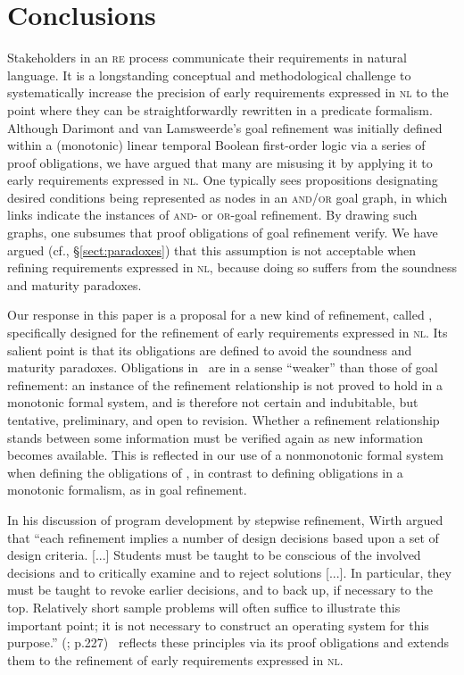 \documentclass[10pt, conference, compsocconf]{IEEEtran}
\begin{document}
\section{Conclusions}\label{sect:conclusions}
Stakeholders in an \textsc{re} process communicate their requirements in natural language.  It is a longstanding conceptual and methodological challenge to systematically increase the precision of early requirements expressed in \textsc{nl} to the point where they can be straightforwardly rewritten in a predicate formalism. Although Darimont and van Lamsweerde's goal refinement \cite{Darimont+:1996:FSE} was initially defined within a (monotonic) linear temporal Boolean first-order logic via a series of proof obligations, we have argued that many are misusing it by applying it to early requirements expressed in \textsc{nl}. One typically sees propositions designating desired conditions being represented as nodes in an \textsc{and}/\textsc{or} goal graph, in which links indicate the instances of \textsc{and}- or \textsc{or}-goal refinement. By drawing such graphs, one subsumes that proof obligations of goal refinement verify. We have argued (cf., \S\ref{sect:paradoxes}) that this assumption is not acceptable when refining requirements expressed in \textsc{nl}, because doing so suffers from the soundness and maturity paradoxes. 

Our response in this paper is a proposal for a new kind of refinement, called \nlref, specifically designed for the refinement of early requirements expressed in \textsc{nl}. Its salient point is that its obligations are defined to avoid the soundness and maturity paradoxes. Obligations in \nlref\ are in a sense ``weaker'' than those of goal refinement: an instance of the refinement relationship is not proved to hold in a monotonic formal system, and is therefore not certain and indubitable, but tentative, preliminary, and open to revision. Whether a refinement relationship stands between some information must be verified again as new information becomes available. This is reflected in our use of a nonmonotonic formal system when defining the obligations of \nlref, in contrast to defining obligations in a monotonic formalism, as in goal refinement. 

In his discussion of program development by stepwise refinement, Wirth argued that ``each refinement implies a number of design decisions based upon a set of design criteria. [...] Students must be taught to be conscious of the involved decisions and to critically examine and to reject solutions [...]. In particular, they must be taught to revoke earlier decisions, and to back up, if necessary to the top. Relatively short sample problems will often suffice to illustrate this important point; it is not necessary to construct an operating system for this purpose.'' (\cite{Wirth:1971:CACM}; p.227) \nlref\ reflects these principles via its proof obligations  and extends them to the refinement of early requirements expressed in \textsc{nl}. 
\end{document}
